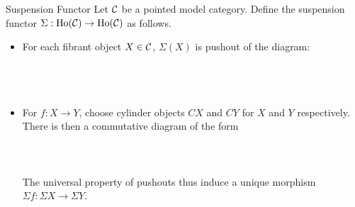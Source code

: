 \documentclass[a4paper]{article}
\begin{document}
\begin{defn}{Suspension Functor}{} Let $\mathcal{C}$ be a pointed model category. Define the suspension functor $\Sigma:\text{Ho}(\mathcal{C})\to\text{Ho}(\mathcal{C})$ as follows. 
\begin{itemize}
\item For each fibrant object $X\in\mathcal{C}$, $\Sigma(X)$ is pushout of the diagram: \\~\\
\\~\\
\item For $f:X\to Y$, choose cylinder objects $CX$ and $CY$ for $X$ and $Y$ respectively. There is then a commutative diagram of the form \\~\\
\\~\\
The universal property of pushouts thus induce a unique morphism $\Sigma f:\Sigma X\to\Sigma Y$. 
\end{itemize}
\end{defn}
\end{document}
